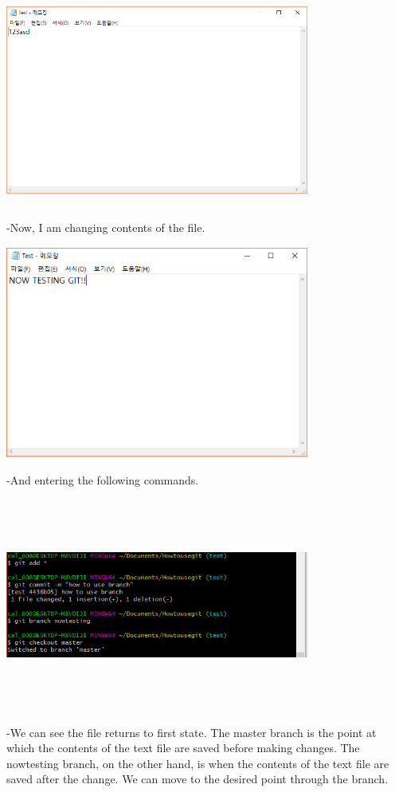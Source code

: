 \documentclass[11pt]{article}
\begin{document}
	\includegraphics[height=7cm, width=10cm]{branch00.PNG}
	\pagebreak
	
	-Now, I am changing contents of the file.	

	\includegraphics[height=7cm, width=10cm]{branch01.PNG}
	
	-And entering the following commands.

	\includegraphics[height=7cm, width=10cm]{branch02.PNG}
	
	-We can see the file returns to first state. The master branch is the point at which the contents of the text file are saved before making changes. The nowtesting branch, on the other hand, is when the contents of the text file are saved after the change. We can move to the desired point through the branch.
\end{document}
